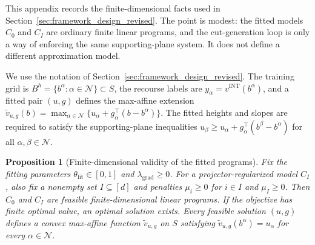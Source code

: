 \documentclass[11pt,letterpaper]{article}
\newtheorem{proposition}[theorem]{Proposition}
\theoremstyle{definition}
\theoremstyle{remark}
\newcommand{\INT}{\mathrm{INT}}
\newcommand{\fit}{\mathrm{fit}}
\begin{document}
This appendix records the finite-dimensional facts used in
Section~\ref{sec:framework_design_revised}. The point is modest: the fitted
models $C_0$ and $C_I$ are ordinary finite linear programs, and the
cut-generation loop is only a way of enforcing the same supporting-plane
system. It does not define a different approximation model.

We use the notation of Section~\ref{sec:framework_design_revised}. The training
grid is $B^h=\{b^\alpha:\alpha\in\mathcal N\}\subset S$, the recourse labels are
$y_\alpha=v^{\INT}(b^\alpha)$, and a fitted pair $(u,g)$ defines the max-affine
extension
$
\widetilde v_{u,g}(b)=
\max_{\alpha\in\mathcal N}\{u_\alpha+g_\alpha^\top(b-b^\alpha)\}.
$
The fitted heights and slopes are required to satisfy the supporting-plane
inequalities
$
u_\beta\ge u_\alpha+g_\alpha^\top(b^\beta-b^\alpha)
$
for all $\alpha,\beta\in\mathcal N$.

\begin{proposition}[Finite-dimensional validity of the fitted programs]
\label{prop:finite_dimensional_validity_fitted_lps}
Fix the fitting parameters $\theta_{\fit}\in[0,1]$ and
$\lambda_{\mathrm{grad}}\ge0$. For a projector-regularized model $C_I$, also
fix a nonempty set $I\subseteq[d]$ and penalties $\mu_i\ge0$ for $i\in I$ and
$\mu_I\ge0$. Then $C_0$ and $C_I$ are feasible finite-dimensional linear
programs. If the objective has finite optimal value, an optimal solution
exists. Every feasible solution $(u,g)$ defines a convex max-affine function
$\widetilde v_{u,g}$ on $S$ satisfying
$\widetilde v_{u,g}(b^\alpha)=u_\alpha$ for every $\alpha\in\mathcal N$.
\end{proposition}
\end{document}
